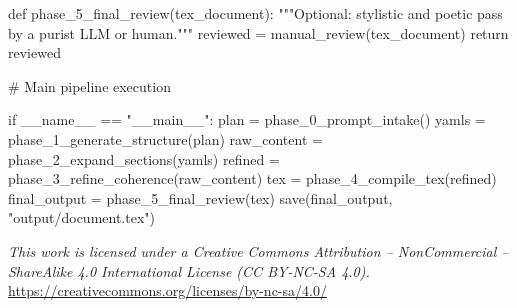 \documentclass[12pt,a4paper]{article}
\begin{document}
\begin{metaoutput}
def phase_5_final_review(tex_document):
    """Optional: stylistic and poetic pass by a purist LLM or human."""
    reviewed = manual_review(tex_document)
    return reviewed

# Main pipeline execution

if __name__ == "__main__":
    plan = phase_0_prompt_intake()
    yamls = phase_1_generate_structure(plan)
    raw_content = phase_2_expand_sections(yamls)
    refined = phase_3_refine_coherence(raw_content)
    tex = phase_4_compile_tex(refined)
    final_output = phase_5_final_review(tex)
    save(final_output, "output/document.tex")				
			\end{metaoutput}
\noindent
\textit{This work is licensed under a Creative Commons Attribution – NonCommercial – ShareAlike 4.0 International License (CC BY-NC-SA 4.0).}\\ \url{https://creativecommons.org/licenses/by-nc-sa/4.0/}
		
\end{document}
